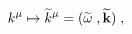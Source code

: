 \begin{equation}
k^\mu \mapsto {\widetilde{k}}^\mu 
= 
( 
 {\widetilde{\omega}}\; , {\widetilde{\bf k}} 
)\;, 
\label{Gamma/k1k2}
\end{equation}

